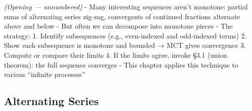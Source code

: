 \documentclass[
  10pt,
  letterpaper,
]{scrbook}
\begin{document}
\emph{(Opening --- unnumbered)} - Many interesting sequences aren't
monotone: partial sums of alternating series zig-zag, convergents of
continued fractions alternate above and below - But often we can
decompose into monotone pieces - The strategy: 1. Identify subsequences
(e.g., even-indexed and odd-indexed terms) 2. Show each subsequence is
monotone and bounded → MCT gives convergence 3. Compute or compare their
limits 4. If the limits agree, invoke §3.1 (union theorem): the full
sequence converges - This chapter applies this technique to various
``infinite processes''

\subsection{Alternating Series}\label{alternating-series}
\end{document}
